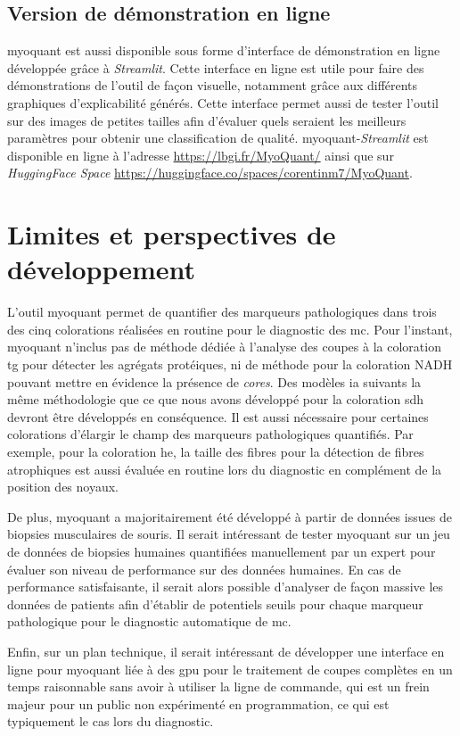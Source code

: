 \subsection{Version de démonstration en ligne}
\gls{myoquant} est aussi disponible sous forme d'interface de démonstration en ligne développée grâce à \textit{Streamlit}. Cette interface en ligne est utile pour faire des démonstrations de l'outil de façon visuelle, notamment grâce aux différents graphiques d'explicabilité générés. Cette interface permet aussi de tester l'outil sur des images de petites tailles afin d'évaluer quels seraient les meilleurs paramètres pour obtenir une classification de qualité. \gls{myoquant}-\textit{Streamlit} est disponible en ligne à l'adresse \href{https://lbgi.fr/MyoQuant/}{https://lbgi.fr/MyoQuant/} ainsi que sur \textit{HuggingFace Space} \href{https://huggingface.co/spaces/corentinm7/MyoQuant}{https://huggingface.co/spaces/corentinm7/MyoQuant}.

\section{Limites et perspectives de développement}
L'outil \gls{myoquant} permet de quantifier des marqueurs pathologiques dans trois des cinq colorations réalisées en routine pour le diagnostic des \gls{mc}. Pour l'instant, \gls{myoquant} n'inclus pas de méthode dédiée à l'analyse des coupes à la coloration \gls{tg} pour détecter les agrégats protéiques, ni de méthode pour la coloration NADH pouvant mettre en évidence la présence de \textit{cores}. Des modèles \gls{ia} suivants la même méthodologie que ce que nous avons développé pour la coloration \gls{sdh} devront être développés en conséquence. Il est aussi nécessaire pour certaines colorations d'élargir le champ des marqueurs pathologiques quantifiés. Par exemple, pour la coloration \gls{he}, la taille des fibres pour  la détection de fibres atrophiques est aussi évaluée en routine lors du diagnostic en complément de la position des noyaux.

De plus, \gls{myoquant} a majoritairement été développé à partir de données issues de biopsies musculaires de souris. Il serait intéressant de tester \gls{myoquant} sur un jeu de données de biopsies humaines quantifiées manuellement par un expert pour évaluer son niveau de performance sur des données humaines. En cas de performance satisfaisante, il serait alors possible d'analyser de façon massive les données de patients afin d'établir de potentiels seuils pour chaque marqueur pathologique pour le diagnostic automatique de \gls{mc}.

 Enfin, sur un plan technique, il serait intéressant de développer une interface en ligne pour \gls{myoquant} liée à des \gls{gpu} pour le traitement de coupes complètes en un temps raisonnable sans avoir à utiliser la ligne de commande, qui est un frein majeur pour un public non expérimenté en programmation, ce qui est typiquement le cas lors du diagnostic.